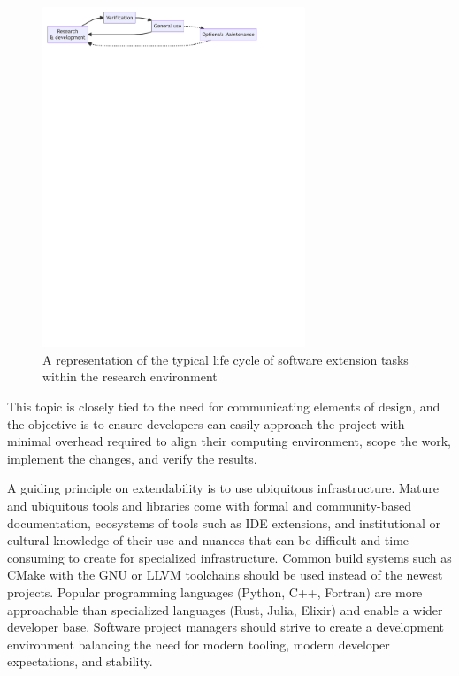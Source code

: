 \documentclass[]{nrel}
\begin{document}
\begin{figure}[htbp]
\begin{center}
\includegraphics[width=0.7\textwidth, trim = 0cm 24cm 0cm 0cm, clip]{figures/mermaid-d1bafe392e85b8f467e3d93074dc8d7b7c45dfd0.pdf}
\caption{A representation of the typical life cycle of software extension tasks within the research environment}
\label{fig:dev_lifecycle}
\end{center}
\end{figure}

This topic is closely tied to the need for communicating elements of design, and the objective is to ensure
developers can easily approach the project with minimal overhead required to align their
computing environment, scope the work, implement the changes, and verify the results.

A guiding principle on extendability is to use ubiquitous infrastructure.
Mature and ubiquitous tools and libraries come with formal and community-based documentation,
ecosystems of tools such as IDE extensions, and institutional or cultural knowledge of
their use and nuances that can be difficult and time consuming to create for specialized
infrastructure.
Common build systems such as CMake with the GNU or LLVM toolchains should be used instead of
the newest projects.
Popular programming languages (Python, C++, Fortran) are more approachable than specialized
languages (Rust, Julia, Elixir) and enable a wider developer base.
Software project managers should strive to create a development environment balancing the need for
modern tooling, modern developer expectations, and stability.
\end{document}

